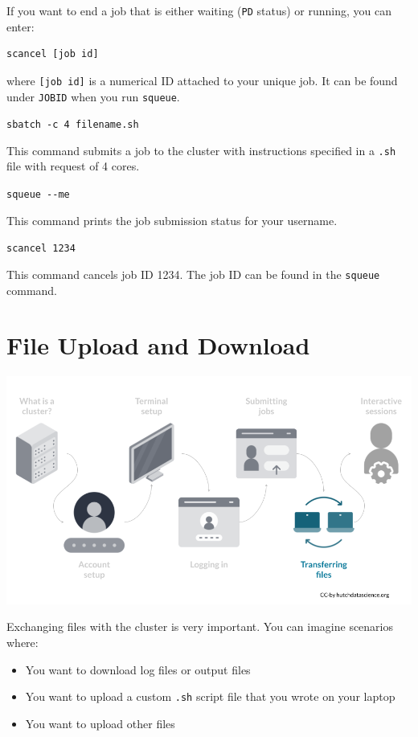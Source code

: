 \documentclass[
]{book}
\providecommand{\tightlist}{%
  \setlength{\itemsep}{0pt}\setlength{\parskip}{0pt}}
\begin{document}
If you want to end a job that is either waiting (\texttt{PD} status) or running, you can enter:

\begin{verbatim}
scancel [job id]
\end{verbatim}

where \texttt{{[}job\ id{]}} is a numerical ID attached to your unique job. It can be found under \texttt{JOBID} when you run \texttt{squeue}.

\texttt{sbatch\ -c\ 4\ filename.sh}

This command submits a job to the cluster with instructions specified in a \texttt{.sh} file with request of 4 cores.

\texttt{squeue\ -\/-me}

This command prints the job submission status for your username.

\texttt{scancel\ 1234}

This command cancels job ID 1234. The job ID can be found in the \texttt{squeue} command.

\hypertarget{file-upload-and-download}{%
\chapter{File Upload and Download}\label{file-upload-and-download}}

\begin{center}\includegraphics[width=0.8\linewidth]{resources/images/08-upload-download_files/figure-latex//1BQxrVYdKZTbpCaF-i_q9w7s9x034lEXpQZDU-Sl09cs_gff2211b72f_1_252} \end{center}

Exchanging files with the cluster is very important. You can imagine scenarios where:

\begin{itemize}
\tightlist
\item
  You want to download log files or output files
\item
  You want to upload a custom \texttt{.sh} script file that you wrote on your laptop
\item
  You want to upload other files
\end{itemize}
\end{document}
